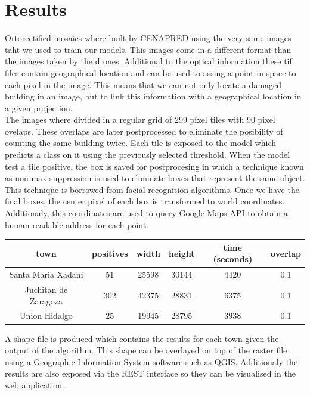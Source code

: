 \section{Results}

Ortorectified mosaics where built by CENAPRED using the very same images taht we used to train our models. This images come in a different format than the images taken by the drones. Additional to the optical information these tif files contain geographical location and can be used to assing a point in space to each pixel in the image. This means that we can not only locate a damaged building in an image, but to link this information with a geographical location in a given projection.\\

The images where divided in a regular grid of 299 pixel tiles with 90 pixel ovelaps. These overlaps are later postprocessed to eliminate the posibility of counting the same building twice. Each tile is exposed to the model which predicts a class on it using the previously selected threshold. When the model test a tile positive, the box is saved for postprocesing in which a technique known as non max suppression is used to eliminate boxes that represent the same object. This technique is borrowed from facial recognition algorithms. Once we have the final boxes, the center pixel of each box is transformed to world coordinates. Additionaly, this coordinates are used to query Google Maps API to obtain a human readable address for each point.


\begin{center}
  \begin{tabular}{|c|c|c|c|c|c|}
    \hline
    town                 & positives & width & height & time (seconds) & overlap\\ \hline
    Santa Maria Xadani   &51         & 25598 & 30144  & 4420           & 0.1 \\ \hline
    Juchitan de Zaragoza &302        & 42375 & 28831  & 6375           & 0.1 \\ \hline
    Union Hidalgo        &25         & 19945 & 28795  & 3938           & 0.1\\
    \hline
  \end{tabular}
\end{center}

A shape file is produced which contains the results for each town given the output of the algorithm. This shape can be overlayed on top of the raster file using a Geographic Information System software such as QGIS. Additionaly the results are also exposed via the REST interface so they can be visualised in the web application.



